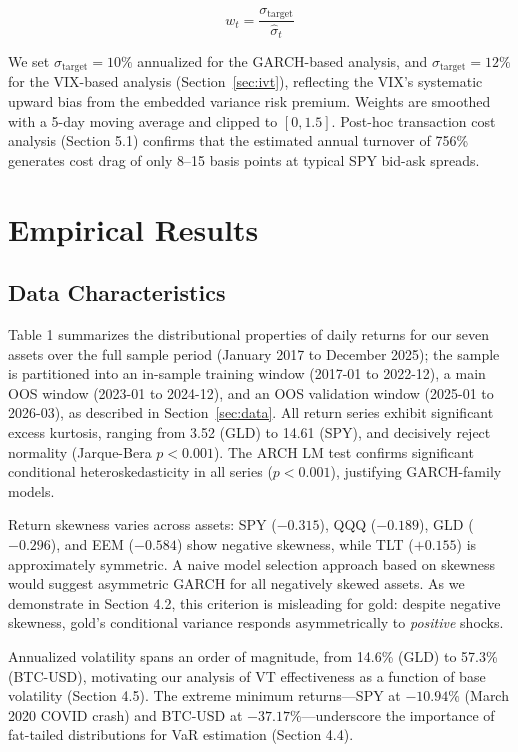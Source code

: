 \begin{equation}
w_t = \frac{\sigma_{\text{target}}}{\hat{\sigma}_t}
\end{equation}

We set $\sigma_{\text{target}} = 10\%$ annualized for the GARCH-based analysis, and $\sigma_{\text{target}} = 12\%$ for the VIX-based analysis (Section~\ref{sec:ivt}), reflecting the VIX's systematic upward bias from the embedded variance risk premium. Weights are smoothed with a 5-day moving average and clipped to $[0, 1.5]$. Post-hoc transaction cost analysis (Section 5.1) confirms that the estimated annual turnover of 756\% generates cost drag of only 8--15 basis points at typical SPY bid-ask spreads.



\section{Empirical Results}

\subsection{Data Characteristics}

Table 1 summarizes the distributional properties of daily returns for our seven assets over the full sample period (January 2017 to December 2025); the sample is partitioned into an in-sample training window (2017-01 to 2022-12), a main OOS window (2023-01 to 2024-12), and an OOS validation window (2025-01 to 2026-03), as described in Section~\ref{sec:data}. All return series exhibit significant excess kurtosis, ranging from 3.52 (GLD) to 14.61 (SPY), and decisively reject normality (Jarque-Bera $p < 0.001$). The ARCH LM test confirms significant conditional heteroskedasticity in all series ($p < 0.001$), justifying GARCH-family models.

Return skewness varies across assets: SPY ($-0.315$), QQQ ($-0.189$), GLD ($-0.296$), and EEM ($-0.584$) show negative skewness, while TLT ($+0.155$) is approximately symmetric. A naive model selection approach based on skewness would suggest asymmetric GARCH for all negatively skewed assets. As we demonstrate in Section 4.2, this criterion is misleading for gold: despite negative skewness, gold's conditional variance responds asymmetrically to \textit{positive} shocks.

Annualized volatility spans an order of magnitude, from 14.6\% (GLD) to 57.3\% (BTC-USD), motivating our analysis of VT effectiveness as a function of base volatility (Section 4.5). The extreme minimum returns---SPY at $-10.94\%$ (March 2020 COVID crash) and BTC-USD at $-37.17\%$---underscore the importance of fat-tailed distributions for VaR estimation (Section 4.4).


